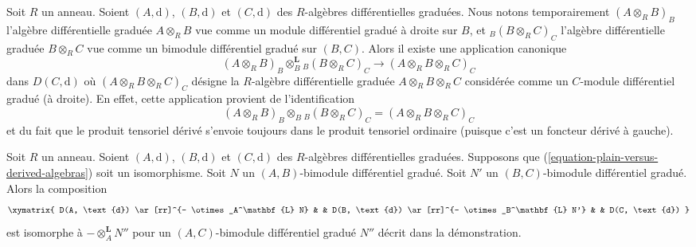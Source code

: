 \noindent
Soit $R$ un anneau. Soient $(A, \text{d})$, $(B, \text{d})$ et $(C, \text{d})$ des
$R$-algèbres différentielles graduées. Nous notons temporairement $(A \otimes_R
B)_B$ l'algèbre différentielle graduée $A \otimes_R B$ vue comme un module
différentiel gradué à droite sur $B$, et ${}_B(B \otimes_R C)_C$ l'algèbre
différentielle graduée $B \otimes_R C$ vue comme un bimodule différentiel gradué
sur $(B, C)$. Alors il existe une application canonique
\begin{equation}
\label{equation-plain-versus-derived-algebras}
(A \otimes_R B)_B \otimes_B^\mathbf{L} {}_B(B \otimes_R C)_C
\longrightarrow
(A \otimes_R B \otimes_R C)_C
\end{equation}
dans $D(C, \text{d})$ où $(A \otimes_R B \otimes_R C)_C$ désigne la $R$-algèbre
différentielle graduée $A \otimes_R B \otimes_R C$ considérée comme un $C$-module
différentiel gradué (à droite). En effet, cette application provient de
l'identification
$$
(A \otimes_R B)_B \otimes_B {}_B(B \otimes_R C)_C =
(A \otimes_R B \otimes_R C)_C
$$
et du fait que le produit tensoriel dérivé s'envoie toujours dans le produit
tensoriel ordinaire (puisque c'est un foncteur dérivé à gauche).

\begin{lemma}
\label{lemma-compose-tensor-functors-general-algebra}
Soit $R$ un anneau. Soient $(A, \text{d})$, $(B, \text{d})$ et $(C, \text{d})$ des
$R$-algèbres différentielles graduées. Supposons que
(\ref{equation-plain-versus-derived-algebras}) soit un isomorphisme. Soit $N$ un
$(A, B)$-bimodule différentiel gradué. Soit $N'$ un $(B, C)$-bimodule différentiel
gradué. Alors la composition
$$
\xymatrix{
D(A, \text{d}) \ar[rr]^{- \otimes_A^\mathbf{L} N} & &
D(B, \text{d}) \ar[rr]^{- \otimes_B^\mathbf{L} N'} & &
D(C, \text{d})
}
$$
est isomorphe à $- \otimes_A^\mathbf{L} N''$ pour un
$(A, C)$-bimodule différentiel gradué $N''$ décrit dans la démonstration.
\end{lemma}

